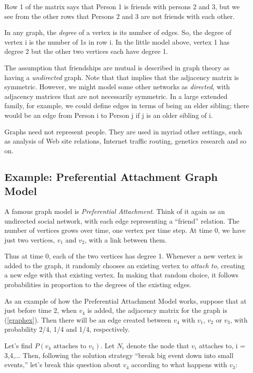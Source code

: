 Row 1 of the matrix says that Person 1 is friends with persons 2 and 3,
but we see from the other rows that Persons 2 and 3 are not friends with
each other.

In any graph, the {\it degree} of a vertex is its number of edges.  So,
the degree of vertex i is the number of 1s in row i.  In the little
model above, vertex 1 has degree 2 but the other two vertices each have
degree 1.

The assumption that friendships are mutual is described in graph theory
as having a {\it undirected} graph.  Note that that implies that the
adjacency matrix is symmetric.  However, we might model some other
networks as {\it directed}, with adjacency matrices that are not
necessarily symmetric.  In a large extended family, for example, we
could define edges in terms of being an elder sibling; there would be an
edge from Person i to Person j if j is an older sibling of i.

Graphs need not represent people.  They are used in myriad other
settings, such as analysis of Web site relations, Internet traffic
routing, genetics research and so on.

\subsection{Example:  Preferential Attachment Graph Model}
\label{prefattach}

A famous graph model is {\it Preferential Attachment}.  Think of it
again as an undirected social network, with each edge representing a
``friend'' relation.  The number of vertices grows over time, one vertex
per time step.  At time 0, we have just two vertices, $v_1$ and $v_2$,
with a link between them.  

Thus at time 0, each of the two vertices has degree 1.  Whenever a new
vertex is added to the graph, it randomly chooses an existing vertex to
{\it attach to}, creating a new edge with that existing vertex.  In
making that random choice, it follows probabilities in proportion to the
degrees of the existing edges.


As an example of how the Preferential Attachment Model works, suppose
that at just before time 2, when $v_4$ is added, the adjacency matrix
for the graph is (\ref{graphex}).  Then there will be an edge created
between $v_4$ with $v_1$, $v_2$ or $v_3$, with probability 2/4, 1/4 and
1/4, respectively.  

Let's find $P(v_4 \textrm{ attaches to } v_1)$.  Let $N_i$ denote the
node that $v_i$ attaches to, i = 3,4,...  Then, following the solution
strategy ``break big event down into small events,'' let's break this
question about $v_4$ according to what happens with $v_3$:

